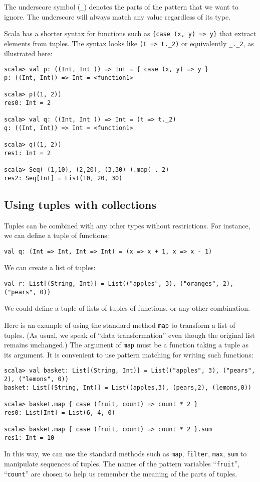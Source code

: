 \noindent The underscore symbol (\lstinline!_!) denotes the parts
of the pattern that we want to ignore. The underscore will always
match any value regardless of its type.

Scala has a shorter syntax for functions such as \lstinline!{case (x, y) => y}!
that extract elements from tuples. The syntax looks like \lstinline!(t => t._2)!
or equivalently \lstinline!_._2!, as illustrated here:
\begin{lstlisting}
scala> val p: ((Int, Int )) => Int = { case (x, y) => y }
p: ((Int, Int)) => Int = <function1>

scala> p((1, 2))
res0: Int = 2

scala> val q: ((Int, Int )) => Int = (t => t._2)
q: ((Int, Int)) => Int = <function1>

scala> q((1, 2))
res1: Int = 2

scala> Seq( (1,10), (2,20), (3,30) ).map(_._2)
res2: Seq[Int] = List(10, 20, 30)
\end{lstlisting}


\subsection{Using tuples with collections}

Tuples can be combined with any other types without restrictions.
For instance, we can define a tuple of functions:
\begin{lstlisting}
val q: (Int => Int, Int => Int) = (x => x + 1, x => x - 1)
\end{lstlisting}
We can create a list of tuples:
\begin{lstlisting}
val r: List[(String, Int)] = List(("apples", 3), ("oranges", 2), ("pears", 0))
\end{lstlisting}
We could define a tuple of lists of tuples of functions, or any other
combination.

Here is an example of using the standard method \lstinline!map! to
transform a list of tuples. (As usual, we speak of \textsf{``}data transformation\textsf{''}
even though the original list remains unchanged.) The argument of
\lstinline!map! must be a function taking a tuple as its argument.
It is convenient to use pattern matching for writing such functions:
\begin{lstlisting}
scala> val basket: List[(String, Int)] = List(("apples", 3), ("pears", 2), ("lemons", 0))
basket: List[(String, Int)] = List((apples,3), (pears,2), (lemons,0))

scala> basket.map { case (fruit, count) => count * 2 }
res0: List[Int] = List(6, 4, 0)

scala> basket.map { case (fruit, count) => count * 2 }.sum
res1: Int = 10
\end{lstlisting}
In this way, we can use the standard methods such as \lstinline!map!,
\lstinline!filter!, \lstinline!max!, \lstinline!sum! to manipulate
sequences of tuples. The names of the pattern variables \textsf{``}\lstinline!fruit!\textsf{''},
\textsf{``}\lstinline!count!\textsf{''} are chosen to help us remember the meaning
of the parts of tuples.

